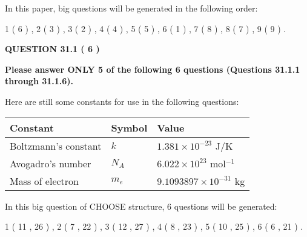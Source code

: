 \documentclass[12pt]{article}
\begin{document}
\vspace{0.3in}
 
 
   
   
   
\vspace{0.2in}
   
In this paper, big questions will be generated in the following order: 
   
   
             1 (           6 )
 ,
             2 (           3 )
 ,
             3 (           2 )
 ,
             4 (           4 )
 ,
             5 (           5 )
 ,
             6 (           1 )
 ,
             7 (           8 )
 ,
             8 (           7 )
 ,
             9 (           9 )
 .
  
\vspace{0.2in}
  
{\textbf{\Large{QUESTION
31.1 
 (           6 )
}}}
  
  
 
{\textbf{\Large{Please answer ONLY
5 of the following
6 questions (Questions
31.1.1 through
31.1.6). }}}
 
Here are still some constants for use in the following questions:
 
 
\noindent\begin{tabular}{|l|l|l|}
\hline
Constant & Symbol & Value \\
\hline
 
Boltzmann's constant &
$k$ &
 $ 1.381 \times 10^{-23} $
J/K \\
\hline
 
Avogadro's number &
$N_A$ &
 $ 6.022 \times 10^{23} $
mol$^{-1}$ \\
\hline
 
Mass of electron &
$m_e$ &
 $ 9.1093897 \times 10^{-31} $
kg \\
\hline
 
\end{tabular}
 
   
\vspace{0.2in}
   
 In this big question of CHOOSE structure,            6  questions will be generated: 
  
  
             1 (          11 ,          26 )
 ,
             2 (           7 ,          22 )
 ,
             3 (          12 ,          27 )
 ,
             4 (           8 ,          23 )
 ,
             5 (          10 ,          25 )
 ,
             6 (           6 ,          21 )
 .
  
\vspace{0.2in}
  
\end{document}
